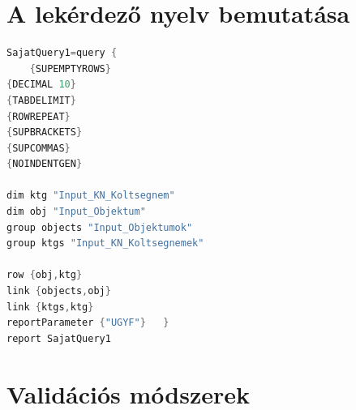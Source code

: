 \section{A lekérdező nyelv bemutatása}

\begin{lstlisting}[language=java,morekeywords={dim,group,row,link,reportParameter,report,query},alsoletter={-},breaklines=true]
SajatQuery1=query {
	{SUPEMPTYROWS}
{DECIMAL 10}
{TABDELIMIT}
{ROWREPEAT}
{SUPBRACKETS}
{SUPCOMMAS}
{NOINDENTGEN}

dim ktg "Input_KN_Koltsegnem"
dim obj "Input_Objektum"
group objects "Input_Objektumok"
group ktgs "Input_KN_Koltsegnemek"

row {obj,ktg}
link {objects,obj}
link {ktgs,ktg}
reportParameter {"UGYF"}   }
report SajatQuery1
\end{lstlisting}

\section{Validációs módszerek}








